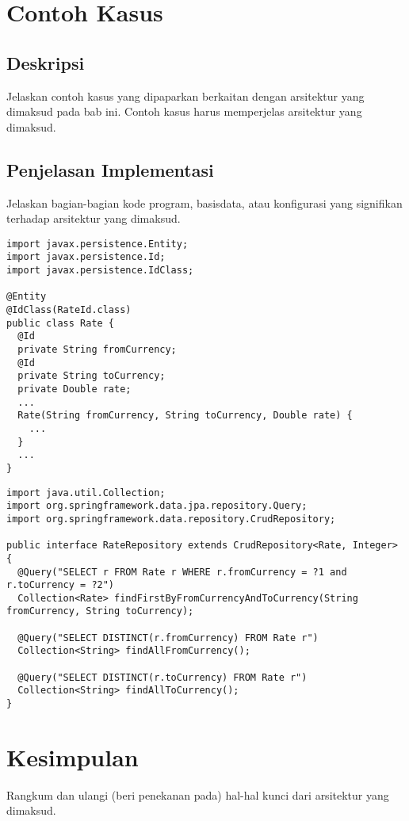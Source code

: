 \section{Contoh Kasus}

\subsection{Deskripsi}
Jelaskan contoh kasus yang dipaparkan berkaitan dengan arsitektur yang dimaksud pada bab ini.
Contoh kasus harus memperjelas arsitektur yang dimaksud.

\subsection{Penjelasan Implementasi}
Jelaskan bagian-bagian kode program, basisdata, atau konfigurasi yang signifikan terhadap arsitektur yang dimaksud.

\begin{lstlisting}[firstnumber=1,style=java,caption={Model dari \textsf{Rate}.},label=lst:rate_model]
import javax.persistence.Entity;
import javax.persistence.Id;
import javax.persistence.IdClass;

@Entity
@IdClass(RateId.class)
public class Rate {
  @Id
  private String fromCurrency;
  @Id
  private String toCurrency;
  private Double rate;
  ...
  Rate(String fromCurrency, String toCurrency, Double rate) {
    ...
  }
  ...
}
\end{lstlisting}

\begin{lstlisting}[firstnumber=1,style=java,caption={ \textsf{RateRepository}.},label=lst:rate_repository]
import java.util.Collection;
import org.springframework.data.jpa.repository.Query;
import org.springframework.data.repository.CrudRepository;

public interface RateRepository extends CrudRepository<Rate, Integer> {  
  @Query("SELECT r FROM Rate r WHERE r.fromCurrency = ?1 and r.toCurrency = ?2")
  Collection<Rate> findFirstByFromCurrencyAndToCurrency(String fromCurrency, String toCurrency);
  
  @Query("SELECT DISTINCT(r.fromCurrency) FROM Rate r")
  Collection<String> findAllFromCurrency();
  
  @Query("SELECT DISTINCT(r.toCurrency) FROM Rate r")
  Collection<String> findAllToCurrency(); 
}
\end{lstlisting}


\section{Kesimpulan}
Rangkum dan ulangi (beri penekanan pada) hal-hal kunci dari arsitektur yang dimaksud.


